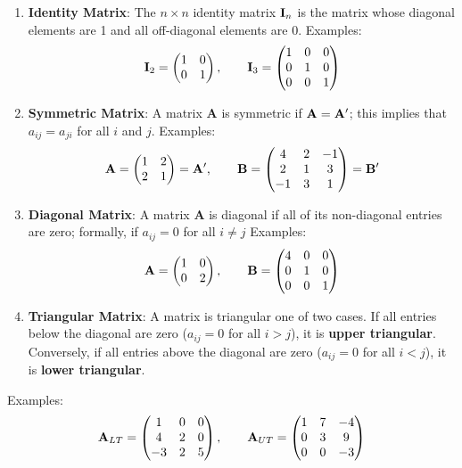 \documentclass[]{book}
\theoremstyle{definition}
\theoremstyle{definition}
\theoremstyle{definition}
\theoremstyle{remark}
\begin{document}
\begin{enumerate}
\def\labelenumi{\arabic{enumi}.}
\item
  \textbf{Identity Matrix}: The \(n\times n\) identity matrix
  \({\bf I}_n\) is the matrix whose diagonal elements are 1 and all
  off-diagonal elements are 0. Examples:
  \[ {\bf I}_2=\begin{pmatrix} 1&0\\0&1 \end{pmatrix}, \qquad {\bf I}_3=\begin{pmatrix} 1&0&0\\ 0&1&0\\ 
          0&0&1 \end{pmatrix}\]
\item
  \textbf{Symmetric Matrix}: A matrix \textbf{A} is symmetric if
  \({\bf A} = {\bf A}'\); this implies that \(a_{ij} = a_{ji}\) for all
  \(i\) and \(j\). Examples:
  \[ {\bf A} = \begin{pmatrix} 1&2\\2&1 \end{pmatrix} = {\bf A}', \qquad {\bf B} =\begin{pmatrix} 4&2&-1\\ 2&1&3\\
          -1&3&1 \end{pmatrix} = {\bf B}'\]
\item
  \textbf{Diagonal Matrix}: A matrix \textbf{A} is diagonal if all of
  its non-diagonal entries are zero; formally, if \(a_{ij} = 0\) for all
  \(i \neq j\) Examples:
  \[ {\bf A} = \begin{pmatrix} 1&0\\0&2 \end{pmatrix}, \qquad {\bf B} =\begin{pmatrix} 4&0&0\\ 0&1&0\\
          0&0&1 \end{pmatrix}\]
\item
  \textbf{Triangular Matrix}: A matrix is triangular one of two cases.
  If all entries below the diagonal are zero (\(a_{ij} = 0\) for all
  \(i > j\)), it is \textbf{upper triangular}. Conversely, if all
  entries above the diagonal are zero (\(a_{ij} = 0\) for all
  \(i < j\)), it is \textbf{lower triangular}.
\end{enumerate}

Examples:
\[ {\bf A}_{LT}= \begin{pmatrix} 1&0 & 0\\4&2&0\\-3 & 2 & 5 \end{pmatrix}, \qquad {\bf A}_{UT}=\begin{pmatrix} 1&7&-4\\ 0&3&9\\
0&0&-3 \end{pmatrix}\]
\end{document}
